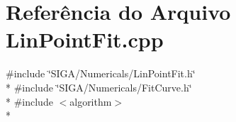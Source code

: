 \section{Referência do Arquivo Lin\+Point\+Fit.\+cpp}
\label{_lin_point_fit_8cpp}
{\ttfamily \#include \char`\"{}S\+I\+G\+A/\+Numericals/\+Lin\+Point\+Fit.\+h\char`\"{}}\\*
{\ttfamily \#include \char`\"{}S\+I\+G\+A/\+Numericals/\+Fit\+Curve.\+h\char`\"{}}\\*
{\ttfamily \#include $<$algorithm$>$}\\*
